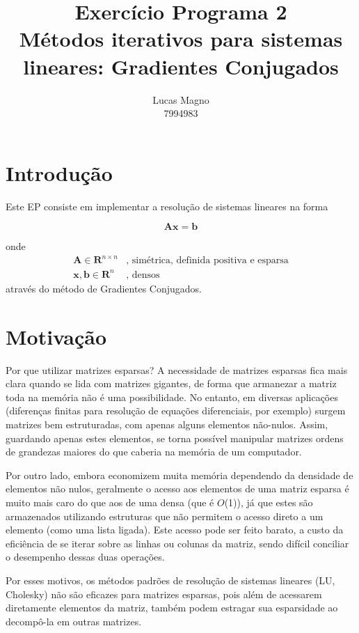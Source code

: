 \documentclass[a4paper,11pt]{article}
\date{}
\author{Lucas Magno \\ 7994983}
\title{Exercício Programa 2 \\ Métodos iterativos para sistemas lineares: Gradientes Conjugados}
\begin{document}
    \maketitle

    \section*{Introdução}
    Este EP consiste em implementar a resolução de sistemas lineares na forma

    $$ \mathbf{Ax} = \mathbf{b} $$

    onde
    \begin{align*}
        \mathbf{A} \in \mathbf{R}^{n\times n} & \text{, simétrica, definida positiva e esparsa} \\
        \mathbf{x}, \mathbf{b}\in \mathbf{R}^{n} & \text{, densos}
    \end{align*}
    através do método de Gradientes Conjugados.

    \section*{Motivação}
    Por que utilizar matrizes esparsas?
    A necessidade de matrizes esparsas fica mais clara quando se lida com matrizes gigantes,
    de forma que armanezar a matriz toda na memória não é uma possibilidade. No entanto,
    em diversas aplicações (diferenças finitas para resolução de equações diferenciais, por exemplo)
    surgem matrizes bem estruturadas, com apenas alguns elementos não-nulos. Assim, guardando
    apenas estes elementos, se torna possível manipular matrizes ordens de grandezas maiores
    do que caberia na memória de um computador.

    Por outro lado, embora economizem muita memória dependendo da densidade de elementos
    não nulos, geralmente o acesso aos elementos de uma matriz esparsa é muito mais caro do que aos
    de uma densa (que é $O$(1)), já que estes são armazenados utilizando estruturas que não
    permitem o acesso direto a um elemento (como uma lista ligada). Este acesso pode ser
    feito barato, a custo da eficiência de se iterar sobre as linhas ou colunas da matriz,
    sendo difícil conciliar o desempenho dessas duas operações.

    Por esses motivos, os métodos padrões de resolução de sistemas lineares (LU, Cholesky)
    não são eficazes para matrizes esparsas, pois além de acessarem diretamente elementos
    da matriz, também podem estragar sua esparsidade ao decompô-la em outras matrizes.
\end{document}
